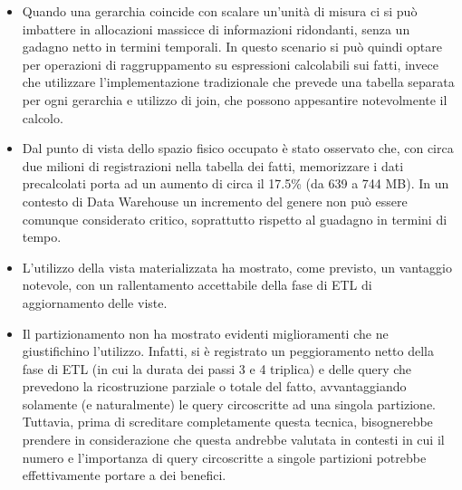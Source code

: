 \begin{itemize}
	\item Quando una gerarchia coincide con scalare un'unità di misura ci si può imbattere in allocazioni massicce di informazioni ridondanti, senza un gadagno netto in termini temporali. In questo scenario si può quindi optare per operazioni di raggruppamento su espressioni	calcolabili sui fatti, invece che utilizzare l’implementazione tradizionale che prevede una tabella separata per ogni gerarchia e utilizzo di join, che possono appesantire notevolmente il calcolo.
	\item Dal punto di vista dello spazio fisico occupato è stato osservato che, con circa due
	milioni di registrazioni nella tabella dei fatti, memorizzare i dati precalcolati porta
	ad un aumento di circa il 17.5\% (da 639 a 744 MB). In un contesto di Data
	Warehouse un incremento del genere non può essere comunque considerato
	critico, soprattutto rispetto al guadagno in termini di tempo.
	\item L’utilizzo della vista materializzata ha mostrato, come previsto, un vantaggio
	notevole, con un rallentamento accettabile della fase di ETL di aggiornamento
	delle viste.
	\item Il partizionamento non ha mostrato evidenti miglioramenti che ne giustifichino
	l’utilizzo. Infatti, si è registrato un peggioramento netto della fase di ETL (in cui la
	durata dei passi 3 e 4 triplica) e delle query che prevedono la ricostruzione parziale
	o totale del fatto, avvantaggiando solamente (e naturalmente) le query circoscritte
	ad una singola partizione. Tuttavia, prima di screditare completamente questa
	tecnica, bisognerebbe prendere in considerazione che questa andrebbe valutata
	in contesti in cui il numero e l’importanza di query circoscritte a singole partizioni
	potrebbe effettivamente portare a dei benefici.
\end{itemize}